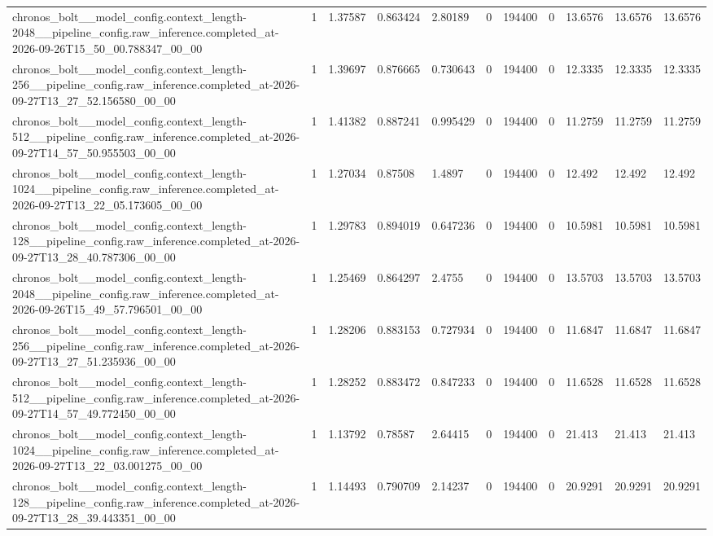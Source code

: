 \begin{tabular}{lllllllllll}
chronos\_bolt\_\_model\_config.context\_length-2048\_\_pipeline\_config.raw\_inference.completed\_at-2026-09-26T15\_50\_00.788347\_00\_00 & 1 & 1.37587 & 0.863424 & 2.80189 & 0 & 194400 & 0 & 13.6576 & 13.6576 & 13.6576 \\
chronos\_bolt\_\_model\_config.context\_length-256\_\_pipeline\_config.raw\_inference.completed\_at-2026-09-27T13\_27\_52.156580\_00\_00 & 1 & 1.39697 & 0.876665 & 0.730643 & 0 & 194400 & 0 & 12.3335 & 12.3335 & 12.3335 \\
chronos\_bolt\_\_model\_config.context\_length-512\_\_pipeline\_config.raw\_inference.completed\_at-2026-09-27T14\_57\_50.955503\_00\_00 & 1 & 1.41382 & 0.887241 & 0.995429 & 0 & 194400 & 0 & 11.2759 & 11.2759 & 11.2759 \\
chronos\_bolt\_\_model\_config.context\_length-1024\_\_pipeline\_config.raw\_inference.completed\_at-2026-09-27T13\_22\_05.173605\_00\_00 & 1 & 1.27034 & 0.87508 & 1.4897 & 0 & 194400 & 0 & 12.492 & 12.492 & 12.492 \\
chronos\_bolt\_\_model\_config.context\_length-128\_\_pipeline\_config.raw\_inference.completed\_at-2026-09-27T13\_28\_40.787306\_00\_00 & 1 & 1.29783 & 0.894019 & 0.647236 & 0 & 194400 & 0 & 10.5981 & 10.5981 & 10.5981 \\
chronos\_bolt\_\_model\_config.context\_length-2048\_\_pipeline\_config.raw\_inference.completed\_at-2026-09-26T15\_49\_57.796501\_00\_00 & 1 & 1.25469 & 0.864297 & 2.4755 & 0 & 194400 & 0 & 13.5703 & 13.5703 & 13.5703 \\
chronos\_bolt\_\_model\_config.context\_length-256\_\_pipeline\_config.raw\_inference.completed\_at-2026-09-27T13\_27\_51.235936\_00\_00 & 1 & 1.28206 & 0.883153 & 0.727934 & 0 & 194400 & 0 & 11.6847 & 11.6847 & 11.6847 \\
chronos\_bolt\_\_model\_config.context\_length-512\_\_pipeline\_config.raw\_inference.completed\_at-2026-09-27T14\_57\_49.772450\_00\_00 & 1 & 1.28252 & 0.883472 & 0.847233 & 0 & 194400 & 0 & 11.6528 & 11.6528 & 11.6528 \\
chronos\_bolt\_\_model\_config.context\_length-1024\_\_pipeline\_config.raw\_inference.completed\_at-2026-09-27T13\_22\_03.001275\_00\_00 & 1 & 1.13792 & 0.78587 & 2.64415 & 0 & 194400 & 0 & 21.413 & 21.413 & 21.413 \\
chronos\_bolt\_\_model\_config.context\_length-128\_\_pipeline\_config.raw\_inference.completed\_at-2026-09-27T13\_28\_39.443351\_00\_00 & 1 & 1.14493 & 0.790709 & 2.14237 & 0 & 194400 & 0 & 20.9291 & 20.9291 & 20.9291 \\

\end{tabular}
